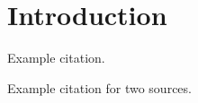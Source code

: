 \chapter{Introduction}


\lipsum[8] Example citation.~\cite{luningham2020BGW-TWAS}

\lipsum[9] Example citation for two sources.~\cite{luningham2020BGW-TWAS,nagpalTIGARImprovedBayesian2019}
